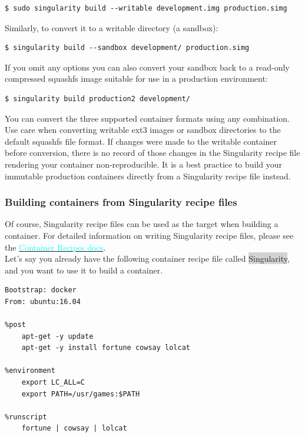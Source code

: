 \documentclass[a4paper]{article}
\begin{document}
\begin{lstlisting}[frame=single] 
$ sudo singularity build --writable development.img production.simg
\end{lstlisting}

	Similarly, to convert it to a writable directory (a sandbox):\\[0.1in]
	
	
\begin{lstlisting}[frame=single] 
$ singularity build --sandbox development/ production.simg
\end{lstlisting}

If you omit any options you can also convert your sandbox back to a read-only compressed squashfs image suitable for use in a production environment:

\begin{lstlisting}[frame=single] 
$ singularity build production2 development/
\end{lstlisting}

You can convert the three supported container formats using any combination.\\[0.1in]
Use care when converting writable ext3 images or sandbox directories to the default squashfs file format. If changes were made to the writable container before conversion, there is no record of those changes in the Singularity recipe file rendering your container non-reproducible. It is a best practice to build your immutable production containers directly from a Singularity recipe file instead.	
	
\subsubsection{Building containers from Singularity recipe files}

Of course, Singularity recipe files can be used as the target when building a container. For detailed information on writing Singularity recipe files, please see the \hyperref[sec:recipefile]{{\textcolor{cyan}{Container Recipes docs}}}.\\
Let’s say you already have the following container recipe file called \colorbox{lightgray}{Singularity}, and you want to use it to build a container.

\begin{lstlisting}[frame=single] 
Bootstrap: docker
From: ubuntu:16.04

%post
    apt-get -y update
    apt-get -y install fortune cowsay lolcat

%environment
    export LC_ALL=C
    export PATH=/usr/games:$PATH

%runscript
    fortune | cowsay | lolcat
\end{lstlisting}
\end{document}
